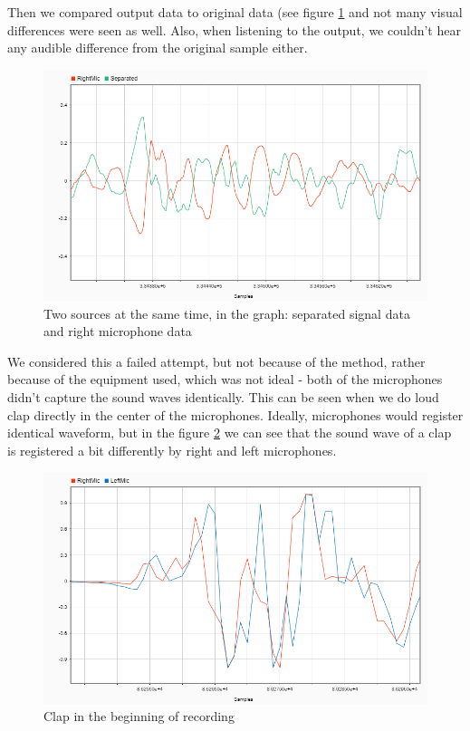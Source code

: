 Then we compared output data to original data (see figure \ref{fig:2sourcesSeparated} and not many visual 
differences were seen as well. Also, when listening to the output, we couldn't hear any audible difference from 
the original sample either.

\begin{figure}[htp]
  \centering
  \includegraphics[width=0.7\linewidth]{Illustrations/twoSourcesSeparatedandOriginal.png}
  \caption{Two sources at the same time, in the graph: separated signal data and right microphone data}
  \label{fig:2sourcesSeparated}
\end{figure}
We considered this a failed attempt, but not because of the method, rather because of the 
equipment used, which was not ideal - both of the microphones didn't capture the sound waves 
identically. This can be seen when we do loud clap directly in the center of the microphones. 
Ideally, microphones would register identical waveform, but in the figure \ref{fig:clap} we can 
see that the sound wave of a clap is registered a bit differently by right and left 
microphones.
\begin{figure}[htp]
  \centering
  \includegraphics[width=0.7\linewidth]{Illustrations/clap.png}
  \caption{Clap in the beginning of recording}
  \label{fig:clap}
\end{figure}

